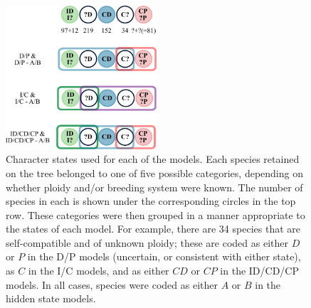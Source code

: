 
\begin{figure}
\centering
\includegraphics[width=0.5\textwidth]{states.pdf}
\caption{
Character states used for each of the models.
Each species retained on the tree belonged to one of five possible categories, depending on whether ploidy and/or breeding system were known.
The number of species in each is shown under the corresponding circles in the top row.
These categories were then grouped in a manner appropriate to the states of each model.
For example, there are 34 species that are self-compatible and of unknown ploidy; these are coded as either $D$ or $P$ in the D/P models (uncertain, or consistent with either state), as $C$ in the I/C models, and as either $CD$ or $CP$ in the ID/CD/CP models.
In all cases, species were coded as either $A$ or $B$ in the hidden state models.
}
\label{figure:stateclassifications}
\end{figure}


